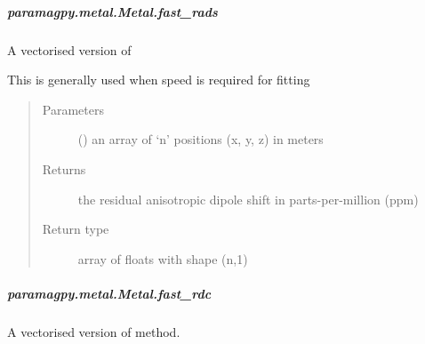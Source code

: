 \documentclass[a4paper,10pt,english,openany,oneside]{sphinxmanual}
\begin{document}
\begin{fulllineitems}
\begin{fulllineitems}
\subparagraph{paramagpy.metal.Metal.fast\_rads}
\label{\detokenize{reference/generated/paramagpy.metal.Metal.fast_rads:paramagpy-metal-metal-fast-rads}}\label{\detokenize{reference/generated/paramagpy.metal.Metal.fast_rads::doc}}

\begin{fulllineitems}
\label{\detokenize{reference/generated/paramagpy.metal.Metal.fast_rads:paramagpy.metal.Metal.fast_rads}}
A vectorised version of {\hyperref[\detokenize{reference/generated/paramagpy.metal.Metal.rads:paramagpy.metal.Metal.rads}]{}}

This is generally used when speed is required for fitting
\begin{quote}\begin{description}
\item[{Parameters}] \leavevmode
{} (\sphinxstyleliteralemphasis{\sphinxupquote{ (}}\sphinxstyleliteralemphasis{\sphinxupquote{,}}\sphinxstyleliteralemphasis{\sphinxupquote{)}}) \textendash{} an array of ‘n’ positions (x, y, z) in meters

\item[{Returns}] \leavevmode
{} \textendash{} the residual anisotropic dipole shift in parts-per-million (ppm)

\item[{Return type}] \leavevmode
array of floats with shape (n,1)

\end{description}\end{quote}

\end{fulllineitems}



\subparagraph{paramagpy.metal.Metal.fast\_rdc}
\label{\detokenize{reference/generated/paramagpy.metal.Metal.fast_rdc:paramagpy-metal-metal-fast-rdc}}\label{\detokenize{reference/generated/paramagpy.metal.Metal.fast_rdc::doc}}

\begin{fulllineitems}
\label{\detokenize{reference/generated/paramagpy.metal.Metal.fast_rdc:paramagpy.metal.Metal.fast_rdc}}
A vectorised version of {\hyperref[\detokenize{reference/generated/paramagpy.metal.Metal.rdc:paramagpy.metal.Metal.rdc}]{}} method.


\end{fulllineitems}
\end{fulllineitems}
\end{fulllineitems}
\end{document}
